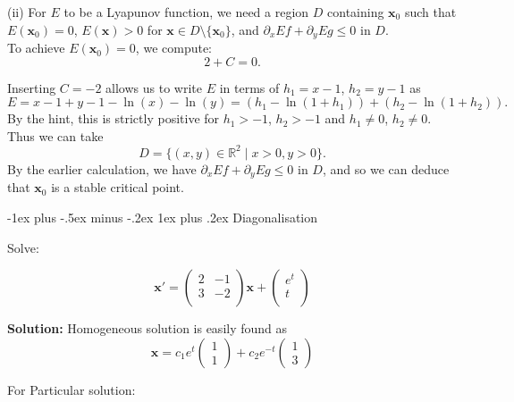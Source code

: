 \documentclass[10pt,landscape]{article}
\makeatletter
\newcommand{\mbf}{\mathbf}
\renewcommand{\subsubsection}{\@startsection{subsubsection}{3}{0mm}%
                                {-1ex plus -.5ex minus -.2ex}%
                                {1ex plus .2ex}%
                                {\normalfont\small\bfseries}}
\makeatother
\begin{document}
\begin{multicols}{2}
(ii) For \(E\) to be a Lyapunov function, we need a region \(D\) containing \(\mathbf{x}_0\) such that \(E(\mathbf{x}_0) = 0\), \(E(\mathbf{x}) > 0\) for \(\mathbf{x} \in D \setminus \{\mathbf{x}_0\}\), and \(\partial_x E f + \partial_y E g \le 0\) in \(D\).\\

To achieve \(E(\mathbf{x}_0) = 0\), we compute:\\
\[
2 + C = 0.
\]

Inserting \(C = -2\) allows us to write \(E\) in terms of  
\(h_1 = x - 1\), \(h_2 = y - 1\) as  \\
\[
E = x - 1 + y - 1 - \ln(x) - \ln(y)  
= (h_1 - \ln(1 + h_1)) + (h_2 - \ln(1 + h_2)).
\]
By the hint, this is strictly positive for \(h_1 > -1\), \(h_2 > -1\) and \(h_1 \neq 0\), \(h_2 \neq 0\). Thus we can take  \\
\[
D = \{(x, y) \in \mathbb{R}^2 \mid x > 0, y > 0\}.
\]
By the earlier calculation, we have \(\partial_x E f + \partial_y E g \le 0\) in \(D\), and so we can deduce that \(\mathbf{x}_0\) is a stable critical point.

\subsubsection{Diagonalisation}

Solve: 

$$\mbf{x}' = \begin{pmatrix}
    2 & -1\\
    3 & -2\\
\end{pmatrix}\mbf{x} +\begin{pmatrix}
    e^t\\
    t\\
\end{pmatrix}$$

\textbf{Solution:} Homogeneous solution is easily found as \\$$\mbf{x} = c_1e^t\begin{pmatrix}
    1\\
    1
\end{pmatrix} + c_2 e^{-t}\begin{pmatrix}
    1\\
    3
\end{pmatrix}$$

For Particular solution:
\bigskip


\end{multicols}
\end{document}
